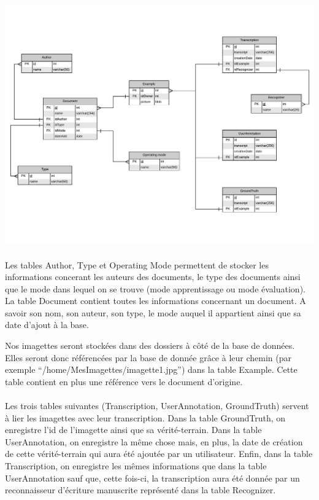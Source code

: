 \begin{mdframed}[frametitle={Figure 7 : Modèle entité association de la Base de données}, innerbottommargin=10]
\begin{center}
\includegraphics[width=\linewidth]{Modele_entite_association.pdf}
\end{center}
\end{mdframed}

\paragraph{}

Les tables Author, Type et Operating Mode permettent de stocker les informations concerant les auteurs des documents, le type des documents ainsi que le mode dans lequel on se trouve (mode apprentissage ou mode évaluation).
La table Document contient toutes les informations concernant un document. A savoir son nom, son auteur, son type, le mode auquel il appartient ainsi que sa date d’ajout à la base.

Nos imagettes seront stockées dans des dossiers à côté de la base de données. Elles seront donc référencées par la base de donnée grâce à leur chemin (par exemple “/home/MesImagettes/imagette1.jpg”) dans la table Example. Cette table contient en plus une référence vers le document d’origine.

\paragraph{}

Les trois tables suivantes (Transcription, UserAnnotation, GroundTruth) servent à lier les imagettes avec leur transcription. Dans la table GroundTruth, on enregistre l’id de l’imagette ainsi que sa vérité-terrain. Dans la table UserAnnotation, on enregistre la même chose mais, en plus, la date de création de cette vérité-terrain qui aura été ajoutée par un utilisateur. Enfin, dans la table Transcription, on enregistre les mêmes informations que dans la table UserAnnotation sauf que, cette fois-ci, la transcription aura été donnée par un reconnaisseur d’écriture manuscrite représenté dans la table Recognizer.

